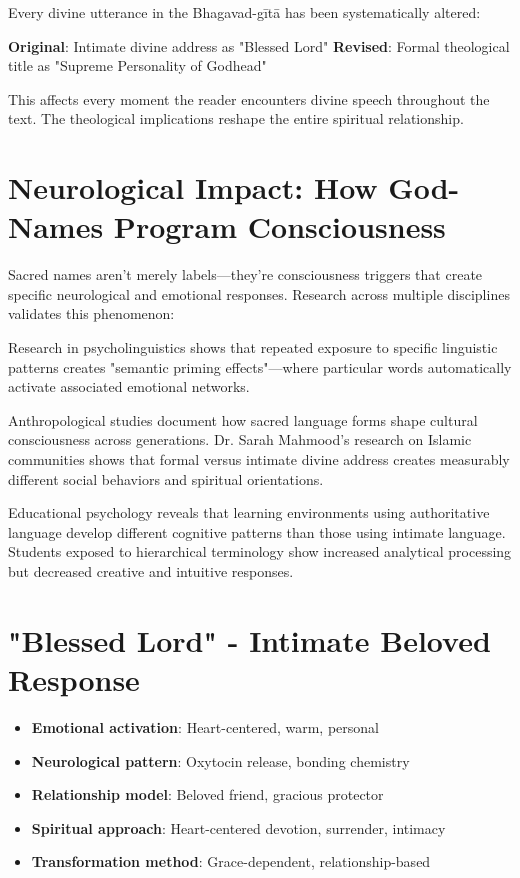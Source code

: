 \documentclass[11pt,twoside]{book}
\begin{document}
Every divine utterance in the Bhagavad-gītā has been systematically altered:

\textbf{\textbf{Original}}: Intimate divine address as "Blessed Lord"
\textbf{\textbf{Revised}}: Formal theological title as "Supreme Personality of Godhead"

This affects every moment the reader encounters divine speech throughout the text. The theological implications reshape the entire spiritual relationship.
\section*{Neurological Impact: How God-Names Program Consciousness}
\label{sec:org9d129ab}

Sacred names aren't merely labels—they're consciousness triggers that create specific neurological and emotional responses. Research across multiple disciplines validates this phenomenon:

Research in psycholinguistics shows that repeated exposure to specific linguistic patterns creates "semantic priming effects"—where particular words automatically activate associated emotional networks.

Anthropological studies document how sacred language forms shape cultural consciousness across generations. Dr. Sarah Mahmood's research on Islamic communities shows that formal versus intimate divine address creates measurably different social behaviors and spiritual orientations.

Educational psychology reveals that learning environments using authoritative language develop different cognitive patterns than those using intimate language. Students exposed to hierarchical terminology show increased analytical processing but decreased creative and intuitive responses.
\section*{"Blessed Lord" - Intimate Beloved Response}
\label{sec:orgc5aac96}
\begin{itemize}
\item \textbf{\textbf{Emotional activation}}: Heart-centered, warm, personal
\item \textbf{\textbf{Neurological pattern}}: Oxytocin release, bonding chemistry
\item \textbf{\textbf{Relationship model}}: Beloved friend, gracious protector
\item \textbf{\textbf{Spiritual approach}}: Heart-centered devotion, surrender, intimacy
\item \textbf{\textbf{Transformation method}}: Grace-dependent, relationship-based
\end{itemize}
\end{document}
